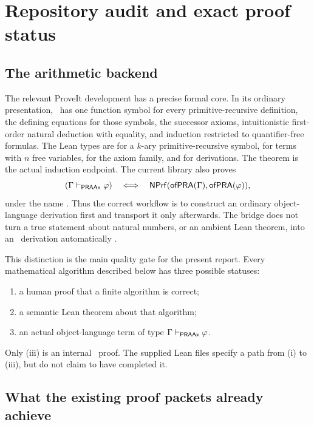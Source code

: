 
\section{Repository audit and exact proof status}
\label{sec:audit}

\subsection{The arithmetic backend}

The relevant ProveIt development has a precise formal core.  In its ordinary presentation, \ipra\ has one function symbol for every primitive-recursive definition, the defining equations for those symbols, the successor axioms, intuitionistic first-order natural deduction with equality, and induction restricted to quantifier-free formulas.  The Lean types are  for a $k$-ary primitive-recursive symbol,  for terms with $n$ free variables,  for the axiom family, and  for derivations.  The theorem  is the actual induction endpoint.  The current library also proves
\[
  (\Gamma\vdash_{\mathsf{PRAAx}}\varphi)
  \quad\Longleftrightarrow\quad
  \mathsf{NPrf}(\mathsf{ofPRA}(\Gamma),\mathsf{ofPRA}(\varphi)),
\]
under the name .  Thus the correct workflow is to construct an ordinary object-language derivation first and transport it only afterwards.  The bridge does not turn a true statement about natural numbers, or an ambient Lean theorem, into an \ipra\ derivation automatically \cite{ProveIt}.

This distinction is the main quality gate for the present report.  Every mathematical algorithm described below has three possible statuses:
\begin{enumerate}[label=(\roman*)]
  \item a human proof that a finite algorithm is correct;
  \item a semantic Lean theorem about that algorithm;
  \item an actual object-language term of type $\Gamma\vdash_{\mathsf{PRAAx}}\varphi$.
\end{enumerate}
Only (iii) is an internal \ipra\ proof.  The supplied Lean files specify a path from (i) to (iii), but do not claim to have completed it.

\subsection{What the existing proof packets already achieve}

